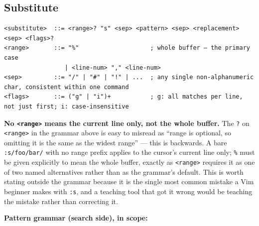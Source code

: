 \documentclass[11pt]{article}
\begin{document}
\hypertarget{sec-substitute}{%
\subsection{Substitute}\label{sec-substitute}}

\begin{Verbatim}[breaklines=true, breakanywhere=true, fontsize=\small]
<substitute>  ::= <range>? "s" <sep> <pattern> <sep> <replacement> <sep> <flags>?
<range>       ::= "%"                    ; whole buffer — the primary case
                 | <line-num> "," <line-num>
<sep>         ::= "/" | "#" | "!" | ...  ; any single non-alphanumeric char, consistent within one command
<flags>       ::= ("g" | "i")+           ; g: all matches per line, not just first; i: case-insensitive
\end{Verbatim}

\textbf{No \texttt{\textless{}range\textgreater{}} means the current line only, not the whole buffer.} The \texttt{?}
on \texttt{\textless{}range\textgreater{}} in the grammar above is easy to misread as ``range is optional,
so omitting it is the same as the widest range'' --- this is backwards. A bare
\texttt{:s/foo/bar/} with no range prefix applies to the cursor's current line
only; \texttt{\%} must be given explicitly to mean the whole buffer, exactly as
\texttt{\textless{}range\textgreater{}} requires it as one of two named alternatives rather than as the
grammar's default. This is worth stating outside the grammar because it is
the single most common mistake a Vim beginner makes with \texttt{:s}, and a
teaching tool that got it wrong would be teaching the mistake rather than
correcting it.

\textbf{Pattern grammar (search side), in scope:}
\end{document}
